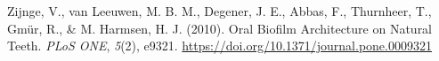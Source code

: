\documentclass[
]{article}
\newlength{\cslhangindent}
\newenvironment{CSLReferences}[2] %
 {\begin{list}{}{%
  \setlength{\itemindent}{0pt}
  \setlength{\leftmargin}{0pt}
  \setlength{\parsep}{0pt}
  \ifodd #1
   \setlength{\leftmargin}{\cslhangindent}
   \setlength{\itemindent}{-1\cslhangindent}
  \fi
  \setlength{\itemsep}{#2\baselineskip}}}
 {\end{list}}
\begin{document}
\begin{CSLReferences}{1}{0}
Zijnge, V., van Leeuwen, M. B. M., Degener, J. E., Abbas, F., Thurnheer,
T., Gmür, R., \& M. Harmsen, H. J. (2010). Oral {Biofilm Architecture}
on {Natural Teeth}. \emph{PLoS ONE}, \emph{5}(2), e9321.
\url{https://doi.org/10.1371/journal.pone.0009321}

\end{CSLReferences}
\end{document}
